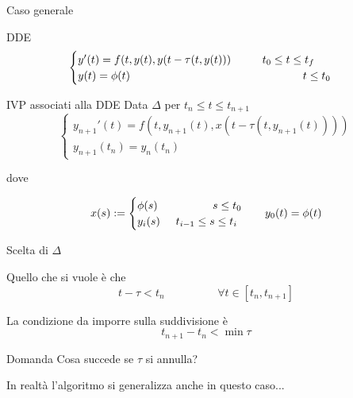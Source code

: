 \documentclass[intlimits]{beamer}
\numberwithin{equation}{section}
\theoremstyle{plain}
\theoremstyle{definition}
\theoremstyle{remark}
\begin{document}
\begin{frame}{Caso generale}
\pause
\begin{block}{DDE}
$$
\begin{cases}
 y'(t) = f(t,y(t),y(t- \tau (t,y(t)))	\hspace{1cm}	t_0 \le t \le t_f \\
 y(t)=\phi(t)				\hspace{5.5cm}	t \le t_0
\end{cases}
$$
\end{block}

\pause
\begin{block}{IVP associati alla DDE}
Data $\Delta$ per \hspace{0.3cm}	 $t_n \le t \le t_{n+1}$
$$
\begin{cases}
 y_{n+1}'(t)= f \left(t, y_{n+1}(t), x(t-\tau(t,y_{n+1}(t))) \right)	\\
 y_{n+1}(t_n)=y_n(t_n)
\end{cases}
$$
\end{block}
\pause
dove
\begin{block}{}
$$
\begin{array}{lc c}
  x(s):=
\begin{cases}
 \phi(s)	\hspace{1.75cm}	s \le t_0			\\
 y_{i}(s)	\hspace{0.5cm}	t_{i-1} \le s \le t_i 	
\end{cases}
&
y_0(t)=\phi(t)
\end{array}
$$
\end{block}

\end{frame}


\begin{frame}{Scelta di $\Delta$}

\pause
\begin{block}{}
 Quello che si vuole è che
$$
t-\tau < t_n		\hspace{2cm}	\forall t \in [t_n,t_{n+1}]
$$
\end{block}


\pause
\begin{block}{}
La condizione da imporre sulla suddivisione è
$$
t_{n+1} - t_n < \min{\tau}
$$
\end{block}

\pause
\begin{block}{Domanda}
 Cosa succede se $\tau$ si annulla?
\end{block}
\vspace{1cm}
\pause
 In realtà l'algoritmo si generalizza anche in questo caso...


 
\end{frame}
\end{document}
